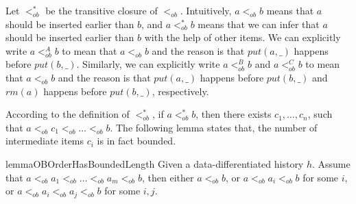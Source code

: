 Let $<_{\textit{ob}}^*$ be the transitive closure of $<_{\textit{ob}}$. Intuitively, $a <_{\textit{ob}} b$ means that $a$ should be inserted earlier than $b$, and $a <_{\textit{ob}}^* b$ means that we can infer that $a$ should be inserted earlier than $b$ with the help of other items. We can explicitly write $a <_{\textit{ob}}^A b$ to mean that $a <_{\textit{ob}} b$ and the reason is that $\textit{put}(a,\_)$ happens before $\textit{put}(b,\_)$. Similarly, we can explicitly write $a <_{\textit{ob}}^B b$ and $a <_{\textit{ob}}^C b$ to mean that $a <_{\textit{ob}} b$ and the reason is that $\textit{put}(a,\_)$ happens before $\textit{put}(b,\_)$ and $\textit{rm}(a)$ happens before $\textit{put}(b,\_)$, respectively.

According to the definition of $<_{\textit{ob}}^*$, if $a <_{\textit{ob}}^* b$, then there exists $c_1,\ldots,c_n$, such that $a <_{\textit{ob}} c_1 <_{\textit{ob}} \ldots <_{\textit{ob}} b$. The following lemma states that, the number of intermediate items $c_i$ is in fact bounded.


\begin{restatable}{lemma}{OBOrderHasBoundedLength}
\label{lemma:ob order has bounded length}
Given a data-differentiated history $h$. Assume that $a <_{\textit{ob}} a_1 <_{\textit{ob}} \ldots <_{\textit{ob}} a_m <_{\textit{ob}} b$, then either $a <_{\textit{ob}} b$, or $a <_{\textit{ob}} a_i <_{\textit{ob}} b$ for some $i$, or $a <_{\textit{ob}} a_i <_{\textit{ob}} a_j <_{\textit{ob}} b$ for some $i,j$.
\end{restatable}


